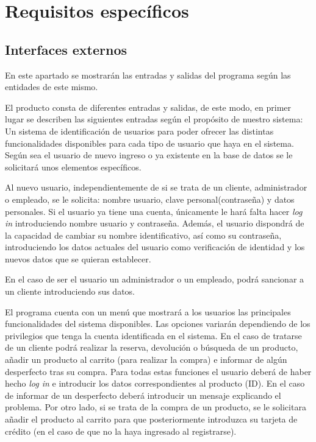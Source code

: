 \section{Requisitos específicos}
\label{sec:req_esp}
\subsection{Interfaces externos}
En este apartado se mostrarán las entradas y salidas del programa según las entidades de este mismo.

El producto consta de diferentes entradas y salidas, de este modo, en primer lugar se describen las siguientes entradas según el propósito de nuestro sistema:
Un sistema de identificación de usuarios para poder ofrecer las distintas funcionalidades disponibles para cada tipo de usuario que haya en el sistema. Según sea el usuario de nuevo ingreso o ya existente en la base de datos se le solicitará unos elementos específicos.

Al nuevo usuario, independientemente de si se trata de un cliente, administrador o empleado, se le solicita: nombre usuario, clave personal(contraseña) y datos personales. Si el usuario ya tiene una cuenta, únicamente le hará falta hacer \textit{log in} introduciendo nombre usuario y contraseña. Además, el usuario dispondrá de la capacidad de cambiar su nombre identificativo, así como su contraseña, introduciendo los datos actuales del usuario como verificación de identidad y los nuevos datos que se quieran establecer.

En el caso de ser el usuario un administrador o un empleado, podrá sancionar a un cliente introduciendo sus datos.

El programa cuenta con un menú que mostrará a los usuarios las principales funcionalidades del sistema disponibles. Las opciones variarán dependiendo de los privilegios que tenga la cuenta identificada en el sistema. En el caso de tratarse de un cliente podrá realizar la reserva, devolución o búsqueda de un producto, añadir un producto al carrito (para realizar la compra) e informar de algún desperfecto tras su compra.
Para todas estas funciones el usuario deberá de haber hecho \textit{log in} e introducir los datos correspondientes al producto (ID). En el caso de informar de un desperfecto deberá introducir un mensaje explicando el problema. Por otro lado, si se trata de la compra de un producto, se le solicitara añadir el producto al carrito para que posteriormente introduzca su tarjeta de crédito (en el caso de que no la haya ingresado al registrarse).

